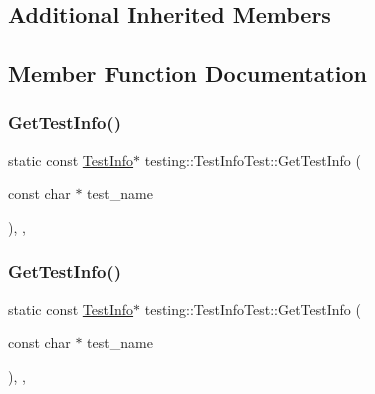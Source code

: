 \subsection*{Additional Inherited Members}


\subsection{Member Function Documentation}
\mbox{\label{classtesting_1_1_test_info_test_a4140c1302bf53c7f1375a23923624f04}} 
\subsubsection{\texorpdfstring{GetTestInfo()}{GetTestInfo()}\hspace{0.1cm}{\footnotesize\ttfamily [1/3]}}
{\footnotesize\ttfamily static const \mbox{\hyperlink{classtesting_1_1_test_info}{Test\+Info}}$\ast$ testing\+::\+Test\+Info\+Test\+::\+Get\+Test\+Info (\begin{DoxyParamCaption}\item[{const char $\ast$}]{test\+\_\+name }\end{DoxyParamCaption})\hspace{0.3cm}{\ttfamily [inline]}, {\ttfamily [static]}, {\ttfamily [protected]}}

\mbox{\label{classtesting_1_1_test_info_test_a4140c1302bf53c7f1375a23923624f04}} 
\subsubsection{\texorpdfstring{GetTestInfo()}{GetTestInfo()}\hspace{0.1cm}{\footnotesize\ttfamily [2/3]}}
{\footnotesize\ttfamily static const \mbox{\hyperlink{classtesting_1_1_test_info}{Test\+Info}}$\ast$ testing\+::\+Test\+Info\+Test\+::\+Get\+Test\+Info (\begin{DoxyParamCaption}\item[{const char $\ast$}]{test\+\_\+name }\end{DoxyParamCaption})\hspace{0.3cm}{\ttfamily [inline]}, {\ttfamily [static]}, {\ttfamily [protected]}}

